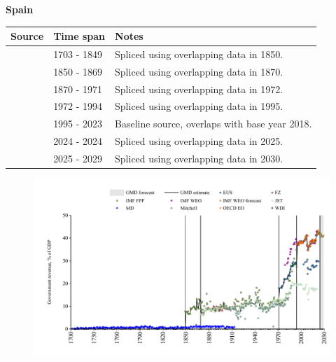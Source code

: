 \documentclass[12pt,a4paper,landscape]{article}
\begin{document}
\begin{adjustbox}{max totalsize={\paperwidth}{\paperheight},center}
\begin{minipage}[t][\textheight][t]{\textwidth}
\vspace*{0.5cm}
{}
\begin{center}
{\Large\bfseries Spain}
\end{center}
\vspace{0.5cm}
\begin{table}[H]
\centering
\small
\begin{tabular}{|l|l|l|}
\hline
\textbf{Source} & \textbf{Time span} & \textbf{Notes} \\
\hline
\rowcolor{white}\cite{MD}& 1703 - 1849 &Spliced using overlapping data in 1850.\\
\rowcolor{lightgray}\cite{IMF_FPP}& 1850 - 1869 &Spliced using overlapping data in 1870.\\
\rowcolor{white}\cite{JST}& 1870 - 1971 &Spliced using overlapping data in 1972.\\
\rowcolor{lightgray}\cite{WDI}& 1972 - 1994 &Spliced using overlapping data in 1995.\\
\rowcolor{white}\cite{OECD_EO}& 1995 - 2023 &Baseline source, overlaps with base year 2018.\\
\rowcolor{lightgray}\cite{EUS}& 2024 - 2024 &Spliced using overlapping data in 2025.\\
\rowcolor{white}\cite{IMF_WEO_forecast}& 2025 - 2029 &Spliced using overlapping data in 2030.\\
\hline
\end{tabular}
\end{table}
\begin{figure}[H]
\centering
\includegraphics[width=\textwidth,height=0.6\textheight,keepaspectratio]{graphs/ESP_govrev_GDP.pdf}
\end{figure}
\end{minipage}
\end{adjustbox}
\end{document}
